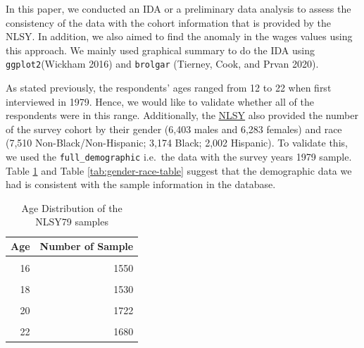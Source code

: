 \documentclass{article}
\begin{document}
In this paper, we conducted an IDA or a preliminary data analysis to assess the consistency of the data with the cohort information that is provided by the NLSY. In addition, we also aimed to find the anomaly in the wages values using this approach. We mainly used graphical summary to do the IDA using \texttt{ggplot2}(Wickham 2016) and \texttt{brolgar} (Tierney, Cook, and Prvan 2020).

As stated previously, the respondents' ages ranged from 12 to 22 when first interviewed in 1979. Hence, we would like to validate whether all of the respondents were in this range. Additionally, the \href{https://www.nlsinfo.org/content/cohorts/nlsy79/intro-to-the-sample/nlsy79-sample-introduction}{NLSY} also provided the number of the survey cohort by their gender (6,403 males and 6,283 females) and race (7,510 Non-Black/Non-Hispanic; 3,174 Black; 2,002 Hispanic). To validate this, we used the \texttt{full\_demographic} i.e.~the data with the survey years 1979 sample. Table \ref{tab:age-table} and Table \ref{tab:gender-race-table} suggest that the demographic data we had is consistent with the sample information in the database.

\begin{table}

\caption{\label{tab:age-table}Age Distribution of the NLSY79 samples}
\centering
\begin{tabular}[t]{r|r}
\hline
Age & Number of Sample\\
\hline
\cellcolor{gray!6}{15} & \cellcolor{gray!6}{1265}\\
\hline
16 & 1550\\
\hline
\cellcolor{gray!6}{17} & \cellcolor{gray!6}{1600}\\
\hline
18 & 1530\\
\hline
\cellcolor{gray!6}{19} & \cellcolor{gray!6}{1662}\\
\hline
20 & 1722\\
\hline
\cellcolor{gray!6}{21} & \cellcolor{gray!6}{1677}\\
\hline
22 & 1680\\
\hline
\end{tabular}
\end{table}
\end{document}
